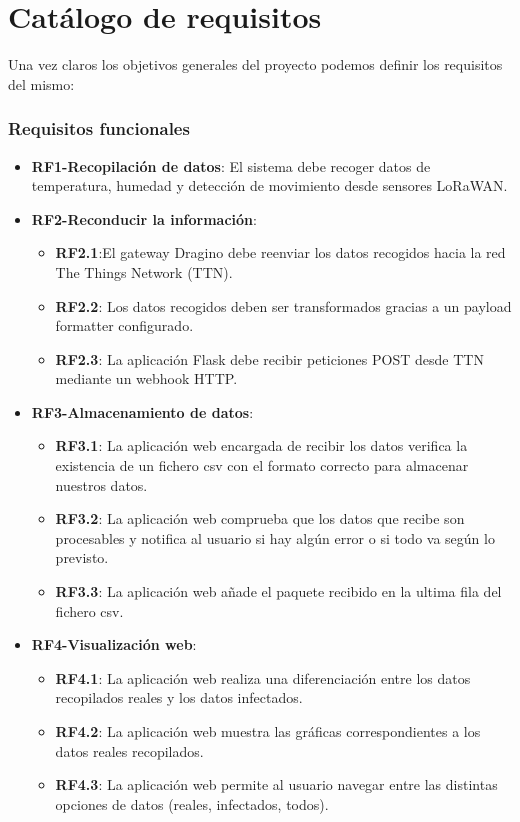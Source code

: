\section{Catálogo de requisitos}
Una vez claros los objetivos generales del proyecto podemos definir los requisitos del mismo:
\subsubsection{Requisitos funcionales}

\begin{itemize}
    \item \textbf{RF1-Recopilación de datos}: El sistema debe recoger datos de temperatura, humedad y detección de movimiento desde sensores LoRaWAN.
    \item \textbf{RF2-Reconducir la información}: 
    \begin{itemize}
    \item \textbf{RF2.1}:El gateway Dragino debe reenviar los datos recogidos hacia la red The Things Network (TTN).
    \item \textbf{RF2.2}: Los datos recogidos deben ser transformados gracias a un payload formatter configurado.
    \item \textbf{RF2.3}: La aplicación Flask debe recibir peticiones POST desde TTN mediante un webhook HTTP.
    \end{itemize}
    \item \textbf{RF3-Almacenamiento de datos}:
    \begin{itemize}
    \item \textbf{RF3.1}: La aplicación web encargada de recibir los datos verifica la existencia de un fichero csv con el formato correcto para almacenar nuestros datos.
    \item \textbf{RF3.2}: La aplicación web comprueba que los datos que recibe son procesables y notifica al usuario si hay algún error o si todo va según lo previsto. 
    \item \textbf{RF3.3}: La aplicación web añade el paquete recibido en la ultima fila del fichero csv.
    \end{itemize}
    \item \textbf{RF4-Visualización web}:
    \begin{itemize}
    \item \textbf{RF4.1}: La aplicación web realiza una diferenciación entre los datos recopilados reales y los datos infectados.
    \item \textbf{RF4.2}: La aplicación web muestra las gráficas correspondientes a los datos reales recopilados.
    \item \textbf{RF4.3}: La aplicación web permite al usuario navegar entre las distintas opciones de datos (reales, infectados, todos).
    \end{itemize}
\end{itemize}
